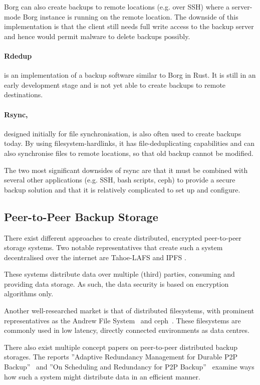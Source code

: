 Borg can also create backups to remote locations (e.g. over SSH) where a server-mode Borg instance is running on the remote location. The downside of this implementation is that the client still needs full write access to the backup server and hence would permit malware to delete backups possibly.

\paragraph{Rdedup} \cite{rdedup} is an implementation of a backup software similar to Borg in Rust. It is still in an early development stage and is not yet able to create backups to remote destinations.

\paragraph{Rsync,} \cite{rsync} designed initially for file synchronisation, is also often used to create backups today. By using filesystem-hardlinks, it has file-deduplicating capabilities and can also synchronise files to remote locations, so that old backup cannot be modified.

The two most significant downsides of rsync are that it must be combined with several other applications (e.g. SSH, bash scripts, ceph) to provide a secure backup solution and that it is relatively complicated to set up and configure.

\subsection{Peer-to-Peer Backup Storage}
There exist different approaches to create distributed, encrypted peer-to-peer storage systems. Two notable representatives that create such a system decentralised over the internet are Tahoe-LAFS \cite{tahoe-lafs} and IPFS \cite{ipfs}.

These systems distribute data over multiple (third) parties, consuming and providing data storage. As such, the data security is based on encryption algorithms only.

Another well-researched market is that of distributed filesystems, with prominent representatives as the Andrew File System~\cite{afs} and ceph~\cite{ceph}. These filesystems are commonly used in low latency, directly connected environments as data centres.

There also exist multiple concept papers on peer-to-peer distributed backup storages. The reports ''Adaptive Redundancy Management for Durable P2P
Backup''~\cite{p2p-redundancy} and ''On Scheduling and Redundancy for P2P Backup''~\cite{p2p-scheduling} examine ways how such a system might distribute data in an efficient manner.

